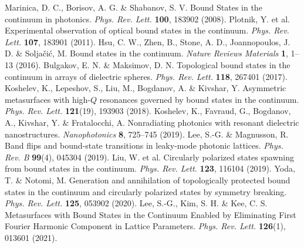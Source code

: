 \documentclass[%
 reprint,
superscriptaddress,
 amsmath,amssymb, aps,
]{revtex4-1}
\begin{document}
\begin{thebibliography}{1}
 Marinica, D. C., Borisov, A. G. \& Shabanov, S. V. Bound States in the continuum in photonics. \emph{Phys. Rev. Lett.} {\bf 100}, 183902 (2008).
 Plotnik, Y. et al. Experimental observation of optical bound states in the continuum. \emph{Phys. Rev. Lett.} {\bf 107}, 183901 (2011).
 Hsu, C. W., Zhen, B., Stone, A. D., Joannopoulos, J. D. \& Solja\v{c}i\'{c}, M. Bound states in the continuum. \emph{Nature Reviews Materials} {\bf 1}, 1--13 (2016).
 Bulgakov, E. N. \& Maksimov, D. N. Topological bound states in the continuum in arrays of dielectric spheres. \emph{Phys. Rev. Lett.} {\bf 118}, 267401 (2017).
 Koshelev, K., Lepeshov, S., Liu, M., Bogdanov, A. \& Kivshar, Y. Asymmetric metasurfaces with high-$Q$ resonances governed by bound states in the continuum. \emph{Phys. Rev. Lett.} {\bf 121}(19), 193903 (2018).
 Koshelev, K., Favraud, G., Bogdanov, A., Kivshar, Y. \& Fratalocchi, A. Nonradiating photonics with resonant dielectric nanostructures. \emph{Nanophotonics} {\bf 8}, 725--745 (2019).
 Lee, S.-G. \& Magnusson, R. Band flips and bound-state transitions in leaky-mode photonic lattices. \emph{Phys. Rev. B} {\bf 99}(4), 045304 (2019).
 Liu, W. et al. Circularly polarized states spawning from bound states in the continuum. \emph{Phys. Rev. Lett.} {\bf 123}, 116104 (2019).
 Yoda, T. \& Notomi, M. Generation and annihilation of topologically protected bound states in the continuum and circularly polarized states by symmetry breaking. \emph{Phys. Rev. Lett.} {\bf 125}, 053902 (2020).
 Lee, S.-G., Kim, S. H. \& Kee, C. S. Metasurfaces with Bound States in the Continuum Enabled by Eliminating First Fourier Harmonic Component in Lattice Parameters. \emph{Phys. Rev. Lett.} {\bf 126}(1), 013601 (2021).

\end{thebibliography}
\end{document}
